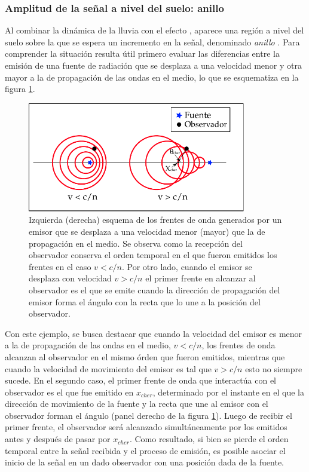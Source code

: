 	\subsubsection{Amplitud de la se\~nal a nivel del suelo: anillo \cher{}}
	\label{sbsc:cher_emision2}
	Al combinar la din\'amica de la lluvia con el efecto \cher{}, aparece una regi\'on a nivel del suelo sobre la que se espera un incremento en la se\~nal, denominado \emph{anillo \cher{}}.
	Para comprender la situaci\'on resulta \'util primero evaluar las diferencias entre la emisi\'on de una fuente de radiaci\'on que se desplaza a una velocidad menor y otra mayor a la de propagaci\'on de las ondas en el medio, lo que se esquematiza en la figura \ref{fig:cher_emision_1}.
	\begin{figure}[ht!]
		\centering
		\includegraphics[width=0.85\textwidth]{fig/EASRadio/cherEmmision}
		\caption{\label{fig:cher_emision_1} Izquierda (derecha) esquema de los frentes de onda generados por un emisor que se desplaza a una velocidad menor (mayor) que la de propagaci\'on en el medio. Se observa como la recepci\'on del observador conserva el orden temporal en el que fueron emitidos los frentes en el caso $v<c/n$. Por otro lado, cuando el emisor se desplaza con velocidad $v>c/n$ el primer frente en alcanzar al observador es el que se emite cuando la direcci\'on de propagaci\'on del emisor forma el \'angulo \cher{} con la recta que lo une a la posici\'on del observador.}
	\end{figure}
	Con este ejemplo, se busca destacar que cuando la velocidad del emisor es menor a la de propagaci\'on de las ondas en el medio, $v<c/n$, los frentes de onda alcanzan al observador en el mismo \'orden que fueron emitidos, mientras que cuando la velocidad de movimiento del emisor es tal que $v>c/n$ esto no siempre sucede.
	En el segundo caso, el primer frente de onda que interact\'ua con el observador es el que fue emitido en $x_{cher}$, determinado por el instante en el que la direcci\'on de movimiento de la fuente y la recta que une al emisor con el observador forman el \'angulo \cher{} (panel derecho de la figura \ref{fig:cher_emision_1}).
	Luego de recibir el primer frente, el observador ser\'a alcanzado simult\'aneamente por los emitidos antes y despu\'es de pasar por $x_{cher}$.
	Como resultado, si bien se pierde el orden temporal entre la se\~nal recibida y el proceso de emisi\'on, es posible asociar el inicio de la se\~nal en un dado observador con una posici\'on dada de la fuente.
	
